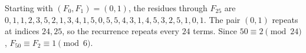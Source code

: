 Starting with $(F_0,F_1)=(0,1)$, the residues through $F_{25}$ are $0,1,1,2,3,5,2,1,3,4,1,5,0,5,5,4,3,1,4,5,3,2,5,1,0,1$. The pair $(0,1)$ repeats at indices $24,25$, so the recurrence repeats every $24$ terms. Since $50\equiv2\pmod{24}$, $F_{50}\equiv F_2\equiv\boxed1\pmod6$.
